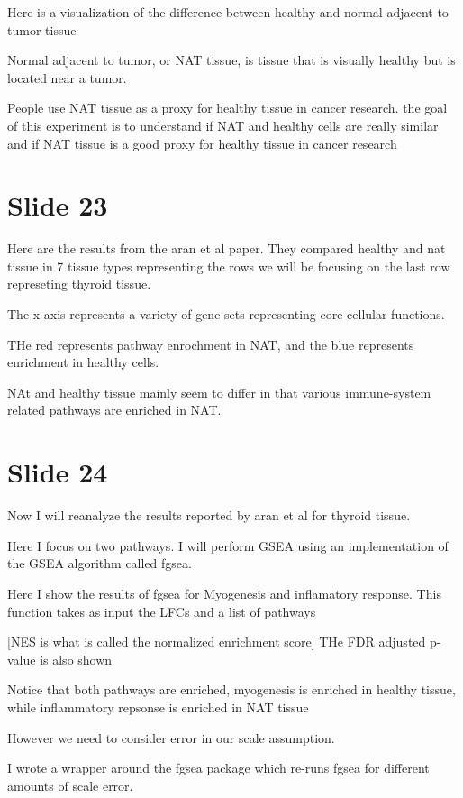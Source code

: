 \documentclass[11pt]{article}
\begin{document}
Here is a visualization of the difference between healthy and normal adjacent to tumor tissue

Normal adjacent to tumor, or NAT tissue, is tissue that is visually healthy but is located near a tumor.

People use NAT tissue as a proxy for healthy tissue in cancer research. the goal of this experiment is to understand
if NAT and healthy cells are really similar and if NAT tissue is a good proxy for healthy tissue in cancer research

\section{Slide 23}
\label{sec:org8271737}

Here are the results from the aran et al paper. They compared healthy and nat tissue in 7 tissue types representing the rows
we will be focusing on the last row represeting thyroid tissue.

The x-axis represents a variety of gene sets representing core cellular functions.

THe red represents pathway enrochment in NAT, and the blue represents enrichment in healthy cells.

NAt and healthy tissue mainly seem to differ in that various immune-system related pathways are enriched in NAT.

\section{Slide 24}
\label{sec:orgef31b17}

Now I will reanalyze the results reported by aran et al for thyroid tissue.

Here I focus on two pathways. I will perform GSEA using an implementation of the GSEA algorithm called
fgsea.

Here I show the results of fgsea for Myogenesis and inflamatory response. This function takes
as input the LFCs and a list of pathways

[NES is what is called the normalized enrichment score] THe FDR adjusted p-value is also shown

Notice that both pathways are enriched, myogenesis is enriched in healthy tissue, while inflammatory
repsonse is enriched in NAT tissue

However we need to consider error in our scale assumption.

I wrote a wrapper around the fgsea package which re-runs fgsea for different amounts of scale error.
\end{document}
